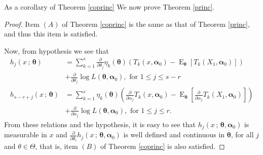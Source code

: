 \documentclass[10pt,a4paper,onecolumn]{article} %
\newcommand{\bs}{\boldsymbol}
\newcommand{\on}{\operatorname}
\begin{document}
\begin{appendix}
As a corollary of Theorem \ref{coprinc} We now prove Theorem \ref{princ}.

\begin{proof} Item $(A)$ of Theorem \ref{coprinc} is the same as that of Theorem \ref{princ}, and thus this item is satisfied.

Now, from hypothesis we see that
\begin{equation*}
\begin{aligned}
h_j(x\,;\,  \bs{\theta}) &= \sum_{k=1}^s \frac{\partial}{\partial \theta_j} \eta_k(\bs{\theta})\left(T_k(x,\bs{\alpha}_0)-\on{E}_{\bs{\theta}}\left[T_k(X_1,\bs{\alpha}_0)\right]\right)\\&+\frac{\partial}{\partial \theta_j}\log L(\bs{\theta},\bs{\alpha}_0),\mbox{ for } 1\leq j\leq s-r\\ 
h_{s-r+j}(x\,;\,  \bs{\theta}) &= \sum_{k=1}^s  \eta_k(\bs{\theta})\left(\frac{\partial}{\partial \alpha_j}T_k(x,\bs{\alpha}_0)-\on{E}_{\bs{\theta}}\left[\frac{\partial}{\partial \alpha_j}T_k(X_1,\bs{\alpha}_0)\right]\right)\\ &+\frac{\partial}{\partial \alpha_j}\log L(\bs{\theta},\bs{\alpha}_0),\mbox{ for } 1\leq j\leq r.
\end{aligned}
\end{equation*}
From these relations and the hypothesis, it is easy to see that $h_j(x\, ;\, \bs{\theta},\bs{\alpha}_0)$ is measurable in $x$ and $\frac{\partial}{\partial \theta_i}h_j(x\, ;\, \bs{\theta},\bs{\alpha}_0)$ is well defined and continuous in $\bs{\theta}$, for all $j$ and $\theta\in \Theta$, that is, item $(B)$ of Theorem \ref{coprinc} is also satisfied.


\end{proof}
\end{appendix}
\end{document}

